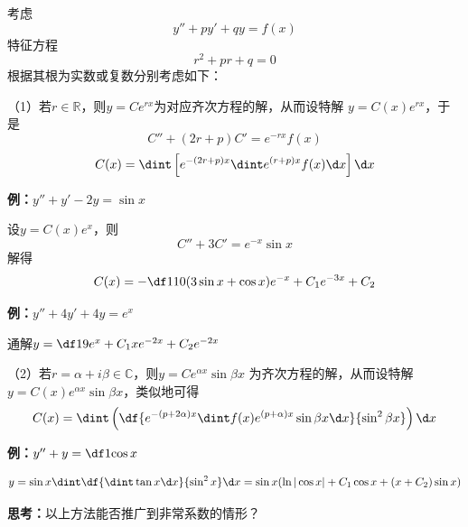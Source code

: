 考虑
$$y''+py'+qy=f(x)$$
特征方程
$$r^2+pr+q=0$$
根据其根为实数或复数分别考虑如下：

（1）若$r\in\mathbb{R}$，则$y=Ce^{rx}$为对应齐次方程的解，从而设特解
$y=C(x)e^{rx}$，于是
$$C''+(2r+p)C'=e^{-rx}f(x)$$
$$C(x)=\dint\left[e^{-(2r+p)x}\dint e^{(r+p)x}f(x)\d x\right]\d x$$

{\bf 例：}$y''+y'-2y=\sin x$

设$y=C(x)e^x$，则
$$C''+3C'=e^{-x}\sin x$$
解得
$$C(x)=-\df1{10}(3\sin x+\cos x)e^{-x}+C_1e^{-3x}+C_2$$

{\bf 例：}$y''+4y'+4y=e^x$

通解$y=\df19e^x+C_1xe^{-2x}+C_2e^{-2x}$

（2）若$r=\alpha+i\beta\in\mathbb{C}$，则$y=Ce^{\alpha x}\sin\beta x$
为齐次方程的解，从而设特解$y=C(x)e^{\alpha x}\sin\beta x$，类似地可得
$$C(x)=\dint\left(\df{e^{-(p+2\alpha)x}\dint f(x)
e^{(p+\alpha)x}\sin\beta x\d x}{\sin^2\beta x}\right)\d x$$

{\bf 例：}$y''+y=\df1{\cos x}$

$$y=\sin x\dint\df{\dint\tan x\d x}{\sin^2 x}\d x
=\sin x(\ln|\cos x|+C_1\cos x+(x+C_2)\sin x)$$

{\bf 思考：}以上方法能否推广到非常系数的情形？


